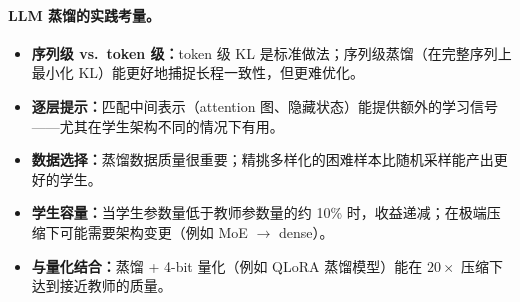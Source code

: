 \paragraph{LLM 蒸馏的实践考量。}
\label{practical-considerations-for-llm-distillation.}

\begin{itemize}
  \item \textbf{序列级 vs.~token 级：}token 级 KL 是标准做法；序列级蒸馏（在完整序列上最小化 KL）能更好地捕捉长程一致性，但更难优化。
  \item \textbf{逐层提示：}匹配中间表示（attention 图、隐藏状态）能提供额外的学习信号——尤其在学生架构不同的情况下有用。
  \item \textbf{数据选择：}蒸馏数据质量很重要；精挑多样化的困难样本比随机采样能产出更好的学生。
  \item \textbf{学生容量：}当学生参数量低于教师参数量的约 10\% 时，收益递减；在极端压缩下可能需要架构变更（例如 MoE $\to$ dense）。
  \item \textbf{与量化结合：}蒸馏 + 4-bit 量化（例如 QLoRA 蒸馏模型）能在 $20\times$ 压缩下达到接近教师的质量。
\end{itemize}

